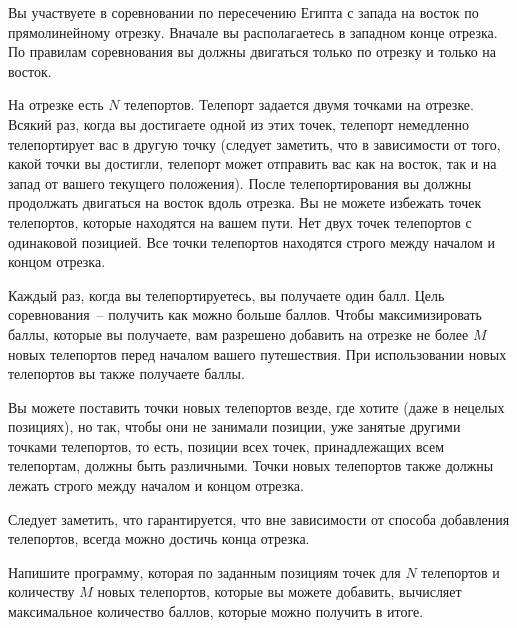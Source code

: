 Вы участвуете в соревновании по пересечению Египта с запада на восток по прямолинейному
отрезку. Вначале вы располагаетесь в западном конце отрезка. По правилам соревнования вы
должны двигаться только по отрезку и только на восток.

На отрезке есть $N$ телепортов. Телепорт задается двумя точками на отрезке. Всякий раз, когда вы достигаете одной из этих точек, телепорт немедленно телепортирует вас в другую точку (следует заметить, что в зависимости от того, какой точки вы достигли, телепорт может отправить вас как на восток, так и на запад от вашего текущего положения). После телепортирования вы должны продолжать двигаться на восток вдоль отрезка. Вы не можете избежать точек телепортов, которые находятся на вашем пути. Нет двух точек телепортов с одинаковой позицией. Все точки телепортов находятся строго между началом и концом отрезка.

Каждый раз, когда вы телепортируетесь, вы получаете один балл. Цель соревнования~-- получить как можно больше баллов. Чтобы максимизировать баллы, которые вы получаете, вам разрешено добавить на отрезке не более $M$ новых телепортов перед началом вашего путешествия. При использовании новых телепортов вы также получаете баллы.

Вы можете поставить точки новых телепортов везде, где хотите (даже в нецелых позициях), но так, чтобы они не занимали позиции, уже занятые другими точками телепортов, то есть, позиции всех точек, принадлежащих всем телепортам, должны быть различными. Точки новых телепортов также должны лежать строго между началом и концом отрезка.

Следует заметить, что гарантируется, что вне зависимости от способа добавления телепортов, всегда можно достичь конца отрезка. 

Напишите программу, которая по заданным позициям точек для $N$ телепортов и количеству $M$
новых телепортов, которые вы можете добавить, вычисляет максимальное количество баллов,
которые можно получить в итоге. 